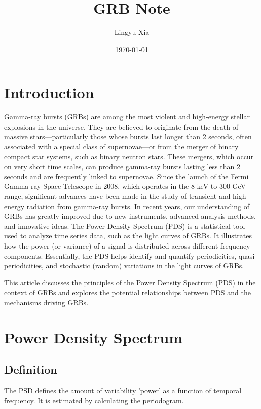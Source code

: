 \documentclass[prd,10pt]{revtex4-2}
\begin{document}

\begin{CJK*}{GB}{}
    \title{GRB Note}
    \date{\today}
    \author{Lingyu Xia}
    \maketitle
\end{CJK*}



\tableofcontents


\section{Introduction}

Gamma-ray bursts (GRBs) are among the most violent and high-energy stellar explosions in the universe. They are believed to originate from the death of massive stars—particularly those whose bursts last longer than 2 seconds, often associated with a special class of supernovae—or from the merger of binary compact star systems, such as binary neutron stars. These mergers, which occur on very short time scales, can produce gamma-ray bursts lasting less than 2 seconds and are frequently linked to supernovae. Since the launch of the Fermi Gamma-ray Space Telescope in 2008, which operates in the 8 keV to 300 GeV range, significant advances have been made in the study of transient and high-energy radiation from gamma-ray bursts. In recent years, our understanding of GRBs has greatly improved due to new instruments, advanced analysis methods, and innovative ideas. The Power Density Spectrum (PDS) is a statistical tool used to analyze time series data, such as the light curves of GRBs. It illustrates how the power (or variance) of a signal is distributed across different frequency components. Essentially, the PDS helps identify and quantify periodicities, quasi-periodicities, and stochastic (random) variations in the light curves of GRBs. 

This article discusses the principles of the Power Density Spectrum (PDS) in the context of GRBs and explores the potential relationships between PDS and the mechanisms driving GRBs.

\section{Power Density Spectrum}
\subsection{Definition}
The PSD defines the amount of variability 'power' as a function of temporal frequency\cite{10.1046/j.1365-2966.2003.07042.x}. It is estimated by calculating the periodogram.
\end{document}
